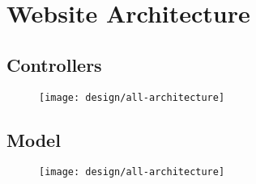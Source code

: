 \chapter{Website Architecture}

\section{Controllers}
\begin{figure}[h]
	\centering
	\texttt{[image: design/all-architecture]}
\end{figure}

\newpage
\section{Model}

\begin{figure}[h]
	\centering
	\texttt{[image: design/all-architecture]}
\end{figure}
